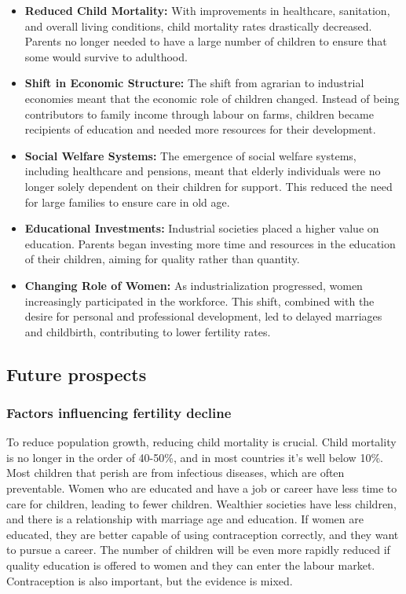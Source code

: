 \documentclass[../summary.tex]{subfiles}
\begin{document}
\begin{itemize}
	\item \textbf{Reduced Child Mortality:} With improvements in healthcare, sanitation, and overall living conditions, child mortality rates drastically decreased. Parents no longer needed to have a large number of children to ensure that some would survive to adulthood.
	\item \textbf{Shift in Economic Structure:} The shift from agrarian to industrial economies meant that the economic role of children changed. Instead of being contributors to family income through labour on farms, children became recipients of education and needed more resources for their development.
	\item \textbf{Social Welfare Systems:} The emergence of social welfare systems, including healthcare and pensions, meant that elderly individuals were no longer solely dependent on their children for support. This reduced the need for large families to ensure care in old age.
	\item \textbf{Educational Investments:} Industrial societies placed a higher value on education. Parents began investing more time and resources in the education of their children, aiming for quality rather than quantity.
	\item \textbf{Changing Role of Women:} As industrialization progressed, women increasingly participated in the workforce. This shift, combined with the desire for personal and professional development, led to delayed marriages and childbirth, contributing to lower fertility rates.
\end{itemize}
\newpage

\subsection{Future prospects}
\subsubsection{Factors influencing fertility decline}

To reduce population growth, reducing child mortality is crucial. Child mortality is no longer in the order of 40-50\%, and in most countries it's well below 10\%. Most children that perish are from infectious diseases, which are often preventable. Women who are educated and have a job or career have less time to care for children, leading to fewer children. Wealthier societies have less children, and there is a relationship with marriage age and education. If women are educated, they are better capable of using contraception correctly, and they want to pursue a career. The number of children will be even more rapidly reduced if quality education is offered to women and they can enter the labour market. Contraception is also important, but the evidence is mixed.
\end{document}
